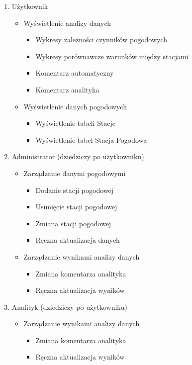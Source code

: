 \documentclass[12pt,a4paper]{article}
\begin{document}
\begin{enumerate}
\item Użytkownik
    \begin{itemize}
    \item Wyświetlenie analizy danych
        \begin{itemize}
        \item Wykresy zależności czynników pogodowych
        \item Wykresy porównawcze warunków między stacjami
        \item Komentarz automatyczny
        \item Komentarz analityka
        \end{itemize}
    \item Wyświetlenie danych pogodowych
        \begin{itemize}
        \item Wyświetlenie tabeli Stacje
        \item Wyświetlenie tabel Stacja Pogodowa
        \end{itemize}
    \end{itemize}
\item Administrator (dziedziczy po użytkowniku)
    \begin{itemize}
    \item Zarządzanie danymi pogodowymi
        \begin{itemize}
        \item Dodanie stacji pogodowej
        \item Usunięcie stacji pogodowej
        \item Zmiana stacji pogodowej
        \item Ręczna aktualizacja danych
        \end{itemize}
    \item Zarządzanie wynikami analizy danych
        \begin{itemize}
        \item Zmiana komentarza analityka
        \item Ręczna aktualizacja wyników
        \end{itemize}
    \end{itemize}
\item Analityk (dziedziczy po użytkowniku)
    \begin{itemize}
    \item Zarządzanie wynikami analizy danych
        \begin{itemize}
        \item Zmiana komentarza analityka
        \item Ręczna aktualizacja wyników
        \end{itemize}
    \end{itemize}
\end{enumerate}
 
\end{document}
